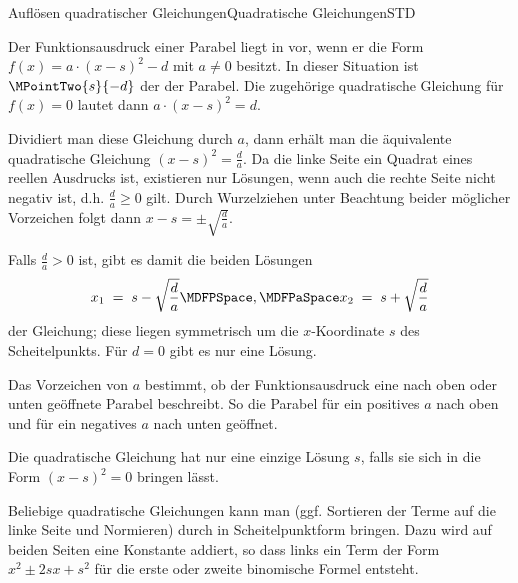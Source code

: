 \begin{MXContent}{Auflösen quadratischer Gleichungen}{Quadratische Gleichungen}{STD}
\begin{MInfo}
Der Funktionsausdruck einer Parabel liegt in
 vor, wenn er die Form
$f(x)=a\cdot (x-s)^2-d$ mit $a\ne 0$ besitzt. In dieser Situation ist
$\MPointTwo{s}{-d}$ der 
der Parabel. Die zugehörige quadratische Gleichung für $f(x)=0$ lautet
dann $a\cdot (x-s)^2=d$.

Dividiert man diese Gleichung durch $a$, dann erhält man die äquivalente
quadratische Gleichung $(x-s)^2=\frac{d}{a}$. Da die linke Seite ein
Quadrat eines reellen Ausdrucks ist, existieren nur Lösungen, wenn auch
die rechte Seite nicht negativ ist, d.h. $\frac{d}{a}\ge 0$ gilt.
Durch Wurzelziehen unter Beachtung beider möglicher Vorzeichen folgt dann
$x-s=\pm\sqrt{\frac{d}{a}}$.

Falls $\frac{d}{a}>0$ ist, gibt es damit die beiden Lösungen
$$
x_1 \;=\; s-\sqrt{\Mdfrac{d}{a}} \MDFPSpace,\MDFPaSpace x_2 \;=\; s+\sqrt{\Mdfrac{d}{a}}
$$
der Gleichung; diese liegen symmetrisch um die $x$-Koordinate $s$ des
Scheitelpunkts. Für $d=0$ gibt es nur eine Lösung.

Das Vorzeichen von $a$ bestimmt, ob der Funktionsausdruck eine nach oben oder
unten geöffnete Parabel beschreibt. So die Parabel für ein positives $a$ nach oben und für ein negatives $a$ nach unten geöffnet.%
\end{MInfo}

Die quadratische Gleichung hat nur eine einzige Lösung $s$, falls sie sich in die Form $(x-s)^2=0$ bringen lässt.

\begin{MInfo}
Beliebige quadratische Gleichungen kann man (ggf. Sortieren der Terme auf die linke Seite und Normieren) durch  in Scheitelpunktform bringen.
Dazu wird auf beiden Seiten eine Konstante addiert, so dass links ein Term der Form $x^2\pm 2s x+s^2$ für die erste oder zweite binomische Formel entsteht.
\end{MInfo}


\end{MXContent}
